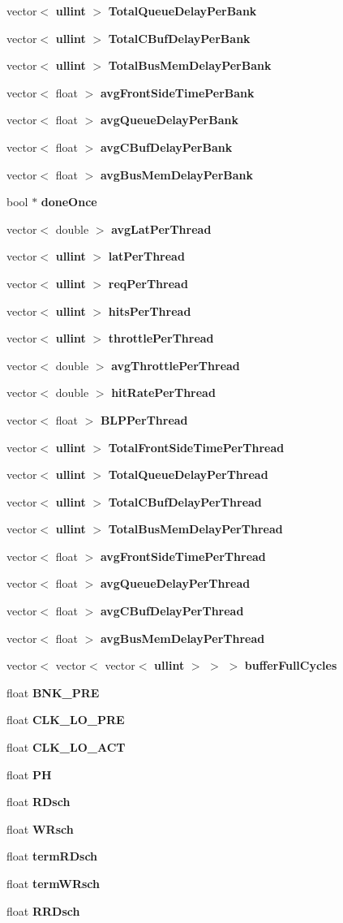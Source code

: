 \begin{CompactItemize}
\item 
vector$<$ {\bf ullint} $>$ {\bf TotalQueueDelayPerBank}
\item 
vector$<$ {\bf ullint} $>$ {\bf TotalCBufDelayPerBank}
\item 
vector$<$ {\bf ullint} $>$ {\bf TotalBusMemDelayPerBank}
\item 
vector$<$ float $>$ {\bf avgFrontSideTimePerBank}
\item 
vector$<$ float $>$ {\bf avgQueueDelayPerBank}
\item 
vector$<$ float $>$ {\bf avgCBufDelayPerBank}
\item 
vector$<$ float $>$ {\bf avgBusMemDelayPerBank}
\item 
bool $\ast$ {\bf doneOnce}
\item 
vector$<$ double $>$ {\bf avgLatPerThread}
\item 
vector$<$ {\bf ullint} $>$ {\bf latPerThread}
\item 
vector$<$ {\bf ullint} $>$ {\bf reqPerThread}
\item 
vector$<$ {\bf ullint} $>$ {\bf hitsPerThread}
\item 
vector$<$ {\bf ullint} $>$ {\bf throttlePerThread}
\item 
vector$<$ double $>$ {\bf avgThrottlePerThread}
\item 
vector$<$ double $>$ {\bf hitRatePerThread}
\item 
vector$<$ float $>$ {\bf BLPPerThread}
\item 
vector$<$ {\bf ullint} $>$ {\bf TotalFrontSideTimePerThread}
\item 
vector$<$ {\bf ullint} $>$ {\bf TotalQueueDelayPerThread}
\item 
vector$<$ {\bf ullint} $>$ {\bf TotalCBufDelayPerThread}
\item 
vector$<$ {\bf ullint} $>$ {\bf TotalBusMemDelayPerThread}
\item 
vector$<$ float $>$ {\bf avgFrontSideTimePerThread}
\item 
vector$<$ float $>$ {\bf avgQueueDelayPerThread}
\item 
vector$<$ float $>$ {\bf avgCBufDelayPerThread}
\item 
vector$<$ float $>$ {\bf avgBusMemDelayPerThread}
\item 
vector$<$ vector$<$ vector$<$ {\bf ullint} $>$ $>$ $>$ {\bf bufferFullCycles}
\item 
float {\bf BNK\_\-PRE}
\item 
float {\bf CLK\_\-LO\_\-PRE}
\item 
float {\bf CLK\_\-LO\_\-ACT}
\item 
float {\bf PH}
\item 
float {\bf RDsch}
\item 
float {\bf WRsch}
\item 
float {\bf termRDsch}
\item 
float {\bf termWRsch}
\item 
float {\bf RRDsch}
\end{CompactItemize}


